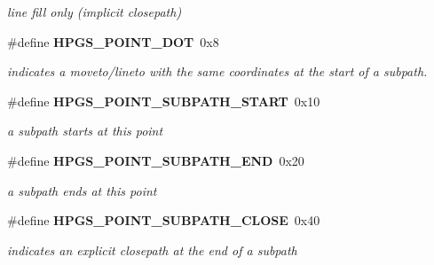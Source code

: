 \begin{CompactItemize}
\begin{CompactList}\small\item\em line fill only (implicit closepath) \item\end{CompactList}\item 
\#define {\bf HPGS\_\-POINT\_\-DOT}~0x8\label{group__path_gf33f767f7b5b8849d65a0e6988386f14}

\begin{CompactList}\small\item\em indicates a moveto/lineto with the same coordinates at the start of a subpath. \item\end{CompactList}\item 
\#define {\bf HPGS\_\-POINT\_\-SUBPATH\_\-START}~0x10\label{group__path_g701397585f03b6cd04df91f618919bb6}

\begin{CompactList}\small\item\em a subpath starts at this point \item\end{CompactList}\item 
\#define {\bf HPGS\_\-POINT\_\-SUBPATH\_\-END}~0x20\label{group__path_g7fa10e914aeb28a8de35407e16e702ae}

\begin{CompactList}\small\item\em a subpath ends at this point \item\end{CompactList}\item 
\#define {\bf HPGS\_\-POINT\_\-SUBPATH\_\-CLOSE}~0x40\label{group__path_g8b553718c2918f34ff13305103cbc4c5}

\begin{CompactList}\small\item\em indicates an explicit closepath at the end of a subpath \item\end{CompactList}\end{CompactItemize}

